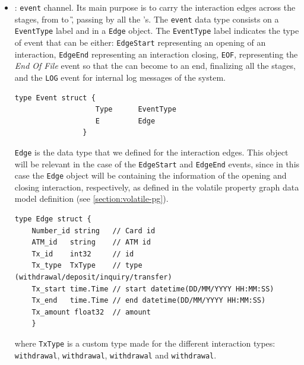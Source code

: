 \begin{itemize}
    \item \eventch: \texttt{event} channel. Its main purpose is to carry the interaction edges across the \DP stages, from \Sr to \G, passing by all the \F's. The \texttt{event} data type consists on a \texttt{EventType} label and in a \texttt{Edge} object. The \texttt{EventType} label indicates the type of event that can be either: \texttt{EdgeStart} representing an opening of an interaction, \texttt{EdgeEnd} representing an interaction closing, \texttt{EOF}, representing the \textit{End Of File} event so that the \DP can become to an end, finalizing all the stages, and the \texttt{LOG} event for internal log messages of the system.
    \begin{center}
    \lstset{style=golangStyle}
    \begin{lstlisting}[caption={\texttt{Event} Data Type}]
                type Event struct {
            	   Type      EventType
            	   E         Edge
                }
    \end{lstlisting}
    \end{center}

    \texttt{Edge} is the data type that we defined for the interaction edges. This object will be relevant in the case of the \texttt{EdgeStart} and \texttt{EdgeEnd} events, since in this case the \texttt{Edge} object will be containing the information of the opening and closing interaction, respectively, as defined in the volatile property graph data model definition (see \ref{section:volatile-pg}).
    
    \begin{center}
    \lstset{style=golangStyle}
    \begin{lstlisting}[caption={Data Type for the interaction edges in Go}]
    type Edge struct {
    Number_id string   // Card id
    ATM_id   string    // ATM id
    Tx_id    int32     // id
    Tx_type  TxType    // type (withdrawal/deposit/inquiry/transfer)
    Tx_start time.Time // start datetime(DD/MM/YYYY HH:MM:SS)
    Tx_end   time.Time // end datetime(DD/MM/YYYY HH:MM:SS)
    Tx_amount float32  // amount
    }
    \end{lstlisting}
    \end{center}

    where \texttt{TxType} is a custom type made for the different interaction types: 
    \texttt{withdrawal}, \texttt{withdrawal}, \texttt{withdrawal} and  \texttt{withdrawal}. 


\end{itemize}
